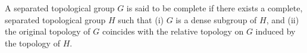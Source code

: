 A separated topological group $G$ is said to be complete if there exists a complete, separated topological group $H$ such that (i) $G$ is a dense subgroup of $H$, and (ii) the original topology of $G$ coincides with the relative topology on $G$ induced by the topology of $H$.
